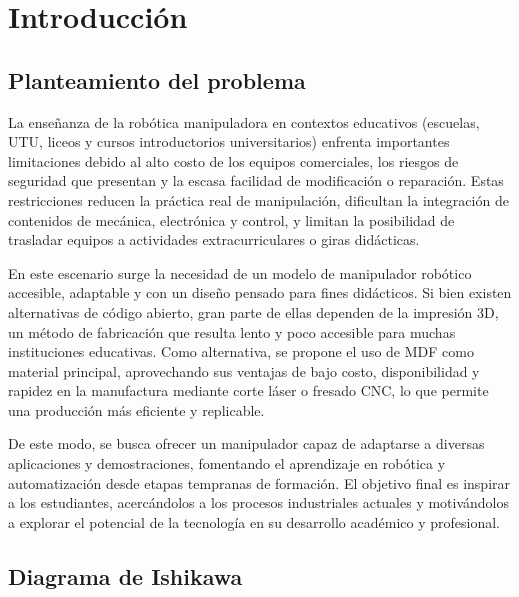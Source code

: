\section{Introducción}
\subsection{Planteamiento del problema}
La enseñanza de la robótica manipuladora en contextos educativos (escuelas, UTU, liceos y cursos introductorios universitarios) enfrenta importantes limitaciones debido al alto costo de los equipos comerciales, los riesgos de seguridad que presentan y la escasa facilidad de modificación o reparación. Estas restricciones reducen la práctica real de manipulación, dificultan la integración de contenidos de mecánica, electrónica y control, y limitan la posibilidad de trasladar equipos a actividades extracurriculares o giras didácticas.

En este escenario surge la necesidad de un modelo de manipulador robótico accesible, adaptable y con un diseño pensado para fines didácticos. Si bien existen alternativas de código abierto, gran parte de ellas dependen de la impresión 3D, un método de fabricación que resulta lento y poco accesible para muchas instituciones educativas. Como alternativa, se propone el uso de MDF como material principal, aprovechando sus ventajas de bajo costo, disponibilidad y rapidez en la manufactura mediante corte láser o fresado CNC, lo que permite una producción más eficiente y replicable.

De este modo, se busca ofrecer un manipulador capaz de adaptarse a diversas aplicaciones y demostraciones, fomentando el aprendizaje en robótica y automatización desde etapas tempranas de formación. El objetivo final es inspirar a los estudiantes, acercándolos a los procesos industriales actuales y motivándolos a explorar el potencial de la tecnología en su desarrollo académico y profesional.

\subsection{Diagrama de Ishikawa}

\vspace{1em}


